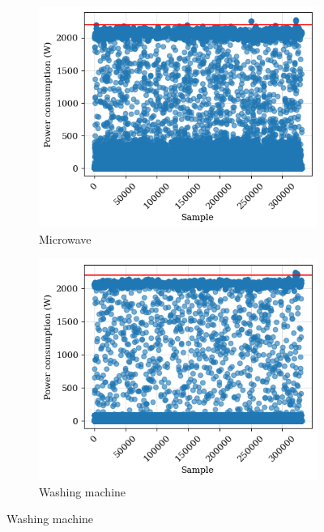 \begin{figure}
\begin{subfigure}{.5\textwidth}
      \includegraphics[width=.9\linewidth]{images/raw_consumptions/microwave.png}
      \caption{Microwave}
      \label{fig:microwave}
    \end{subfigure}%
    \begin{subfigure}{.5\textwidth}
      \centering
      \includegraphics[width=.9\linewidth]{images/raw_consumptions/washing_machine.png}
      \caption{Washing machine}
      \label{fig:washing_machine}
    \end{subfigure}
\end{figure}%
